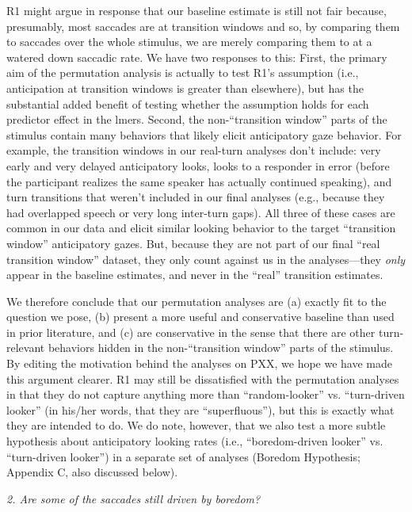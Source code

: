 \documentclass[11pt,a4paper]{letter} %
\begin{document}
\begin{letter}{}
\noindent R1 might argue in response that our baseline estimate is still not fair because, presumably, most saccades are at transition windows and so, by comparing them to saccades over the whole stimulus, we are merely comparing them to at a watered down saccadic rate. We have two responses to this: First, the primary aim of the permutation analysis is actually to test R1's assumption (i.e., anticipation at transition windows is greater than elsewhere), but has the substantial added benefit of testing whether the assumption holds for each predictor effect in the lmers. Second, the non-``transition window'' parts of the stimulus contain many behaviors that likely elicit anticipatory gaze behavior. For example, the transition windows in our real-turn analyses don't include: very early and very delayed anticipatory looks, looks to a responder in error (before the participant realizes the same speaker has actually continued speaking), and turn transitions that weren't included in our final analyses (e.g., because they had overlapped speech or very long inter-turn gaps). All three of these cases are common in our data and elicit similar looking behavior to the target ``transition window'' anticipatory gazes. But, because they are not part of our final ``real transition window'' dataset, they only count against us in the analyses---they \textit{only} appear in the baseline estimates, and never in the ``real'' transition estimates.

\noindent We therefore conclude that our permutation analyses are (a) exactly fit to the question we pose, (b) present a more useful and conservative baseline than used in prior literature, and (c) are conservative in the sense that there are other turn-relevant behaviors hidden in the non-``transition window'' parts of the stimulus. By editing the motivation behind the analyses on PXX, we hope we have made this argument clearer. R1 may still be dissatisfied with the permutation analyses in that they do not capture anything more than ``random-looker'' vs. ``turn-driven looker'' (in his/her words, that they are ``superfluous''), but this is exactly what they are intended to do. We do note, however, that we also test a more subtle hypothesis about anticipatory looking rates (i.e., ``boredom-driven looker'' vs. ``turn-driven looker'') in a separate set of analyses (Boredom Hypothesis; Appendix C, also discussed below).

\noindent \textit{2. Are some of the saccades still driven by boredom?}


\end{letter}
\end{document}
